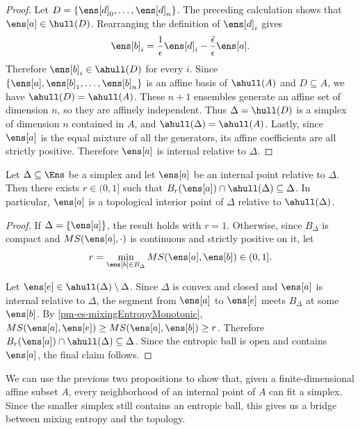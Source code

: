 \begin{mathSection}
\begin{proof}
	Let $D = \{\ens[d]_0, \dots, \ens[d]_n\}$. The preceding calculation shows that $\ens[a] \in \hull(D)$. Rearranging the definition of $\ens[d]_i$ gives
	\begin{equation}
		\ens[b]_i = \frac{1}{\epsilon}\ens[d]_i
		- \frac{\bar{\epsilon}}{\epsilon}\ens[a].
	\end{equation}
	Therefore $\ens[b]_i \in \ahull(D)$ for every $i$. Since $\{\ens[a], \ens[b]_1, \dots, \ens[b]_n\}$ is an affine basis of $\ahull(A)$ and $D \subseteq A$, we have $\ahull(D) = \ahull(A)$. These $n+1$ ensembles generate an affine set of dimension $n$, so they are affinely independent. Thus $\Delta = \hull(D)$ is a simplex of dimension $n$ contained in $A$, and $\ahull(\Delta) = \ahull(A)$. Lastly, since $\ens[a]$ is the equal mixture of all the generators, its affine coefficients are all strictly positive. Therefore $\ens[a]$ is internal relative to $\Delta$.
\end{proof}

\begin{prop}\label{pm-es-simplexEntropicNeighborhood}
	Let $\Delta \subseteq \Ens$ be a simplex and let $\ens[a]$ be an internal point relative to $\Delta$. Then there exists $r \in (0,1]$ such that $B_r(\ens[a])\cap\ahull(\Delta) \subseteq \Delta$. In particular, $\ens[a]$ is a topological interior point of $\Delta$ relative to $\ahull(\Delta)$.
\end{prop}

\begin{proof}
	If $\Delta = \{\ens[a]\}$, the result holds with $r=1$. Otherwise, since $B_\Delta$ is compact and $MS(\ens[a],\cdot)$ is continuous and strictly positive on it, let
	\begin{equation}
		r = \min_{\ens[b] \in B_\Delta} MS(\ens[a],\ens[b]) \in (0,1].
	\end{equation}
	
	Let $\ens[e] \in \ahull(\Delta)\setminus\Delta$. Since $\Delta$ is convex and closed and $\ens[a]$ is internal relative to $\Delta$, the segment from $\ens[a]$ to $\ens[e]$ meets $B_\Delta$ at some $\ens[b]$. By \ref{pm-es-mixingEntropyMonotonic}, $MS(\ens[a],\ens[e]) \geq MS(\ens[a],\ens[b]) \geq r$.	Therefore $B_r(\ens[a])\cap\ahull(\Delta) \subseteq \Delta$. Since the entropic ball is open and contains $\ens[a]$, the final claim follows.
\end{proof}
\end{mathSection}

We can use the previous two propositions to show that, given a finite-dimensional affine subset $A$, every neighborhood of an internal point of $A$ can fit a simplex. Since the smaller simplex still contains an entropic ball, this gives us a bridge between mixing entropy and the topology.


